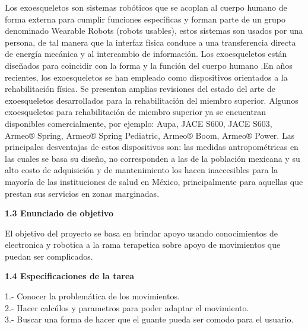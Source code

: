 \documentclass[12pt,letterpaper]{report}
\begin{document}
\begin{flushleft}
\begin{flushleft}
\begin{flushleft}
\begin{flushleft}
\begin{flushleft}
\begin{flushleft}
\begin{flushleft}
\begin{flushleft}
\begin{flushleft}
\begin{flushleft}
Los exoesqueletos son sistemas robóticos que se acoplan al cuerpo humano de forma externa para cumplir funciones específicas y forman parte de un grupo denominado Wearable Robots (robots usables), estos sistemas son usados por una persona, de tal manera que la interfaz física conduce a una transferencia directa de energía mecánica y al intercambio de información. Los exoesqueletos están diseñados para coincidir con la forma y la función del cuerpo humano .En años recientes, los exoesqueletos se han empleado como dispositivos orientados a la rehabilitación física. Se presentan amplias revisiones del estado del arte de exoesqueletos desarrollados para la rehabilitación del miembro superior. Algunos exoesqueletos para rehabilitación de miembro superior ya se encuentran disponibles comercialmente, por ejemplo: Aupa, JACE S600, JACE S603, Armeo® Spring, Armeo® Spring Pediatric, Armeo® Boom, Armeo® Power. Las principales desventajas de estos dispositivos son: las medidas antropométricas en las cuales se basa su diseño, no corresponden a las de la población mexicana y su alto costo de adquisición y de mantenimiento los hacen inaccesibles para la mayoría de las instituciones de salud en México, principalmente para aquellas que prestan sus servicios en zonas marginadas.
\begin{flushleft}
\textbf{1.3 Enunciado de objetivo}
\begin{flushleft}
El objetivo del proyecto se basa en brindar apoyo usando conocimientos de electronica y robotica a la rama terapetica sobre apoyo de movimientos que puedan ser complicados.
\begin{flushleft}
\textbf{1.4 Especificaciones de la tarea}
\begin{flushleft}

1.- Conocer la problemática de los movimientos.\\

2.- Hacer calcúlos y parametros para poder adaptar el movimiento.\\

3.- Buscar una forma de hacer que el guante pueda ser comodo para el usuario.\\


\end{flushleft}
\end{flushleft}
\end{flushleft}
\end{flushleft}
\end{flushleft}
\end{flushleft}
\end{flushleft}
\end{flushleft}
\end{flushleft}
\end{flushleft}
\end{flushleft}
\end{flushleft}
\end{flushleft}
\end{flushleft}
\end{document}
